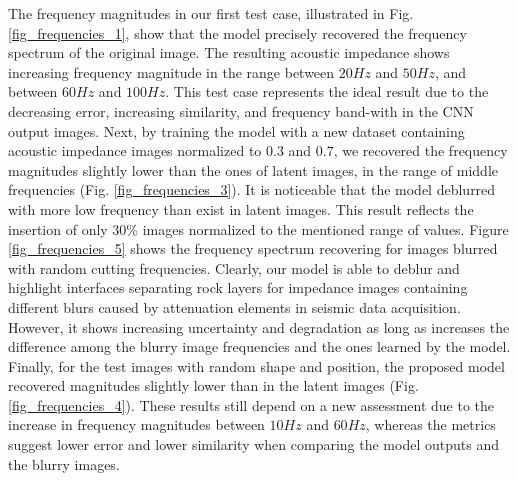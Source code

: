 \documentclass[conference]{IEEEtran}
\begin{document}
The frequency magnitudes in our first test case, illustrated in Fig. \ref{fig_frequencies_1},
show that the model precisely recovered the frequency spectrum of the original image.
The resulting acoustic impedance shows increasing frequency magnitude in the range
between $ 20Hz$ and $ 50Hz $, and between $ 60Hz $ and $ 100Hz $.
This test case represents the ideal result due to the
decreasing error, increasing similarity, and frequency band-with in the CNN output images.
Next, by training the model with a new dataset containing acoustic impedance images normalized to $0.3$ and $0.7$, we recovered the frequency magnitudes slightly lower than the ones of latent images, in the range of middle frequencies
(Fig. \ref{fig_frequencies_3}). It is noticeable that the model deblurred with
more low frequency than exist in latent images. This result reflects the insertion of only $30\%$ images normalized to the mentioned range
of values.
Figure \ref{fig_frequencies_5} shows the frequency spectrum recovering for images blurred with random cutting
frequencies. Clearly, our model is able to deblur and highlight interfaces separating rock layers for impedance images containing different blurs caused by attenuation elements in seismic data acquisition. However, it shows increasing uncertainty and degradation as long as increases the difference among the blurry image frequencies and the ones learned by the model.
Finally, for the test images with random shape and position, the proposed model recovered magnitudes slightly lower than in the latent images (Fig. \ref{fig_frequencies_4}). These results still depend on a new assessment due to the increase in frequency magnitudes between $10Hz$ and $60Hz$,  whereas the metrics suggest lower error and lower similarity when comparing the model outputs and the blurry images.
\end{document}
